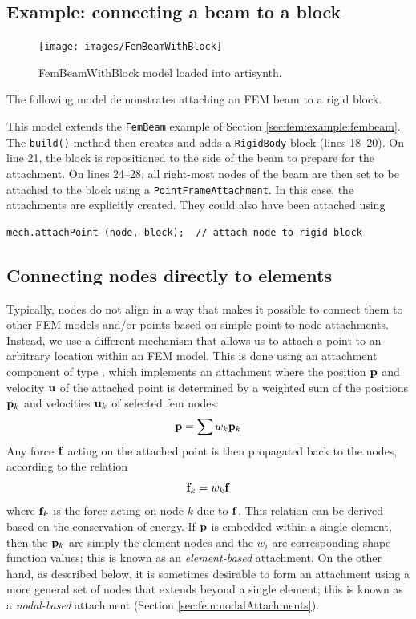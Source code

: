 \subsection{Example: connecting a beam to a block}

\begin{figure}[ht]
	\centering
	\texttt{[image: images/FemBeamWithBlock]}
	\caption{FemBeamWithBlock model loaded into artisynth.}
	\label{fig:fem:beamwithblock}
\end{figure}

The following model demonstrates attaching an FEM beam to a rigid block.
\lstset{numbers=left}

\lstset{numbers=none}
This model extends the {\tt FemBeam} example of Section 
\ref{sec:fem:example:fembeam}.  The {\tt build()} method then creates 
and adds a {\tt RigidBody} block (lines 18--20).  On line 21, the block
is repositioned to the side of the beam to prepare for the attachment.
On lines 24--28, all right-most nodes of the beam are then set to be attached
to the block using a {\tt PointFrameAttachment}.  In this case, the 
attachments are explicitly created.  They could also have been attached using
\begin{lstlisting}[]
   mech.attachPoint (node, block);  // attach node to rigid block
\end{lstlisting}

\subsection{Connecting nodes directly to elements}

Typically, nodes do not align in a way that makes it
possible to connect them to other FEM models and/or points based on
simple point-to-node attachments.  Instead, we use a different
mechanism that allows us to attach a point to an arbitrary location
within an FEM model. This is done using an attachment component of
type
, which
implements an attachment where the position ${\bf p}$ and velocity ${\bf u}$ of the
attached point is determined by a weighted sum of the positions ${\bf p}_k$ 
and velocities ${\bf u}_k$ of selected fem nodes:
%
\begin{equation}
{\bf p} = \sum w_k {\bf p}_k
\label{pointFemAttachment:eqn}
\end{equation}
%
Any force ${\bf f}$ acting on the attached point is then propagated back
to the nodes, according to the relation
%
\begin{equation}
{\bf f}_k = w_k {\bf f}
\label{pointFemForces:eqn}
\end{equation}
%
where ${\bf f}_k$ is the force acting on node $k$ due to ${\bf f}$.  This
relation can be derived based on the conservation of energy.
If ${\bf p}$ is embedded within a single element, then the ${\bf p}_k$ are
simply the element nodes and the $w_i$ are corresponding shape
function values; this is known as an {\it element-based} attachment.
On the other hand, as described below, it is sometimes desirable to
form an attachment using a more general set of nodes that extends
beyond a single element; this is known as a {\it nodal-based}
attachment (Section \ref{sec:fem:nodalAttachments}).

